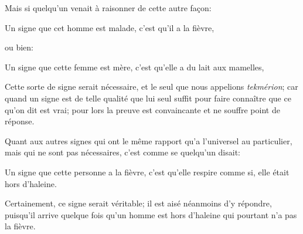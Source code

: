 Mais si quelqu'un venait à raisonner de cette autre façon:

\begin{emphpar}
      Un signe que cet homme est malade, c'est qu'il a la fièvre,
\end{emphpar}

ou bien:

\begin{emphpar}
      Un signe que cette femme est mère, c'est qu'elle a du lait aux mamelles,
\end{emphpar}

Cette sorte de signe serait nécessaire, et le seul que nous appelions \emph{tekmérion}; car quand un signe est de telle qualité que lui seul suffit
pour faire connaître que ce qu'on dit est vrai; pour lors la preuve est convaincante et ne souffre point de réponse.

Quant aux autres signes qui ont le même rapport qu'a l'universel au particulier, mais qui ne sont pas nécessaires, c'est comme se quelqu'un disait:

\begin{emphpar}
      Un signe que cette personne a la fièvre, c'est  qu'elle respire comme si, elle était hors d'haleine.
\end{emphpar}

Certainement, ce signe serait véritable; il est aisé néanmoins d'y répondre, puisqu'il arrive quelque fois qu'un homme est hors d'haleine qui
pourtant n'a pas la fièvre.

\bigbreak

